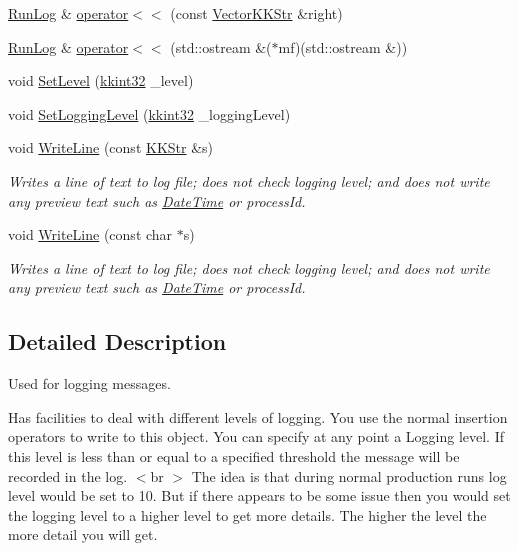 \begin{DoxyCompactItemize}
\item 
\hyperlink{class_k_k_b_1_1_run_log}{Run\+Log} \& \hyperlink{class_k_k_b_1_1_run_log_acc7ca4e3ff106abcc8495eb35a2e1ea5}{operator$<$$<$} (const \hyperlink{class_k_k_b_1_1_vector_k_k_str}{Vector\+K\+K\+Str} \&right)
\item 
\hyperlink{class_k_k_b_1_1_run_log}{Run\+Log} \& \hyperlink{class_k_k_b_1_1_run_log_abef0e77790d0fc30f254bf4f7c5b54b8}{operator$<$$<$} (std\+::ostream \&($\ast$mf)(std\+::ostream \&))
\item 
void \hyperlink{class_k_k_b_1_1_run_log_a342b8af476cede9c936a04dcd9745bd4}{Set\+Level} (\hyperlink{namespace_k_k_b_a8fa4952cc84fda1de4bec1fbdd8d5b1b}{kkint32} \+\_\+level)
\item 
void \hyperlink{class_k_k_b_1_1_run_log_a7cac990780a02c936930e9b8e8e33d17}{Set\+Logging\+Level} (\hyperlink{namespace_k_k_b_a8fa4952cc84fda1de4bec1fbdd8d5b1b}{kkint32} \+\_\+logging\+Level)
\item 
void \hyperlink{class_k_k_b_1_1_run_log_aa65f7bd7a57266acd206043f9dbb1351}{Write\+Line} (const \hyperlink{class_k_k_b_1_1_k_k_str}{K\+K\+Str} \&s)
\begin{DoxyCompactList}\small\item\em Writes a line of text to log file; does not check logging level; and does not write any preview text such as \hyperlink{class_k_k_b_1_1_date_time}{Date\+Time} or process\+Id. \end{DoxyCompactList}\item 
void \hyperlink{class_k_k_b_1_1_run_log_a51e8da0ad4e05b4f93c738a0c9234577}{Write\+Line} (const char $\ast$s)
\begin{DoxyCompactList}\small\item\em Writes a line of text to log file; does not check logging level; and does not write any preview text such as \hyperlink{class_k_k_b_1_1_date_time}{Date\+Time} or process\+Id. \end{DoxyCompactList}\end{DoxyCompactItemize}


\subsection{Detailed Description}
Used for logging messages. 

Has facilities to deal with different levels of logging. You use the normal insertion operators to write to this object. You can specify at any point a Logging level. If this level is less than or equal to a specified threshold the message will be recorded in the log. $<$br $>$ The idea is that during normal production runs log level would be set to 10. But if there appears to be some issue then you would set the logging level to a higher level to get more details. The higher the level the more detail you will get. 

